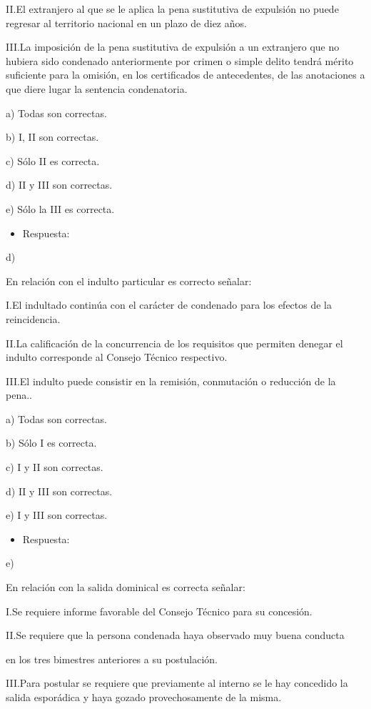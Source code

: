 \documentclass[letterpaper, 11pt]{article}
\begin{document}
II.El extranjero al que se le aplica la pena sustitutiva de expulsión no puede regresar
al territorio nacional en un plazo de diez años.

III.La imposición de la pena sustitutiva de expulsión a un extranjero que no hubiera
sido condenado anteriormente por crimen o simple delito tendrá mérito suficiente
para la omisión, en los certificados de antecedentes, de las anotaciones a que
diere lugar la sentencia condenatoria.


a) Todas son correctas.

b) I, II son correctas.

c) Sólo II es correcta.

d) II y III son correctas.

e) Sólo la III es correcta.

\begin{itemize}
\item Respuesta:
\end{itemize}
d)


En relación con el indulto particular es correcto señalar:

I.El indultado continúa con el carácter de condenado para los efectos de la
reincidencia.

II.La calificación de la concurrencia de los requisitos que permiten denegar el indulto
corresponde al Consejo Técnico respectivo.

III.El indulto puede consistir en la remisión, conmutación o reducción de la pena..

a) Todas son correctas.

b) Sólo I es correcta.

c) I y II son correctas.

d) II y III son correctas.

e) I y III son correctas.

\begin{itemize}
\item Respuesta:
\end{itemize}
e)


En relación con la salida dominical es correcta señalar:


I.Se requiere informe favorable del Consejo Técnico para su concesión.


II.Se requiere que la persona condenada haya observado muy buena
conducta

en los tres bimestres anteriores a su postulación.


III.Para postular se requiere que previamente al interno se le hay
concedido la salida esporádica y haya gozado provechosamente de la
misma.
\end{document}
